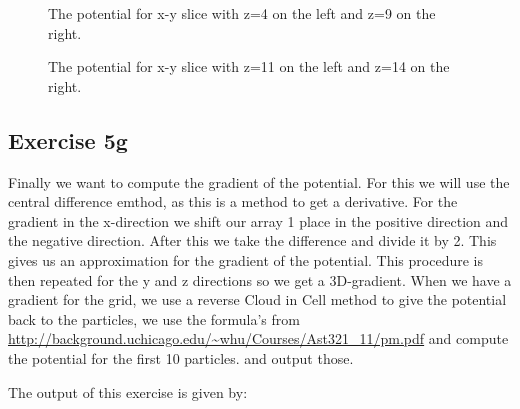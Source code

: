  \begin{figure}
    \centering
    \qquad
    \caption{The potential for x-y slice with z=4 on the left and z=9 on the right.}
  \end{figure}

 \begin{figure}
    \centering
    \qquad
    \caption{The potential for x-y slice with z=11 on the left and z=14 on the right.}
  \end{figure}
  
  \subsection{Exercise 5g}
  Finally we want to compute the gradient of the potential. For this we will use the central difference emthod, as this is a method to get a derivative. For the gradient in the x-direction we shift our array 1 place in the positive direction and the negative direction. After this we take the difference and divide it by 2. This gives us an approximation for the gradient of the potential. This procedure is then repeated for the y and z directions so we get a 3D-gradient. 
  When we have a gradient for the grid, we use a reverse Cloud in Cell method to give the potential back to the particles, we use the formula's from \url{http://background.uchicago.edu/~whu/Courses/Ast321_11/pm.pdf} and compute the potential for the first 10 particles. and output those.
  
  The output of this exercise is given by:


  

